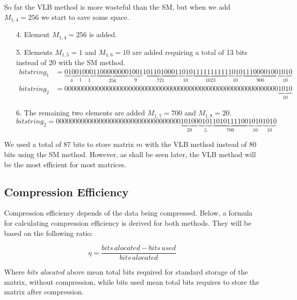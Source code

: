 \documentclass[10pt]{article}
\begin{document}
So far the VLB method is more wasteful than the SM, but when we add $M_{1,4} =256$  we start to save some space.

\begin{enumerate}
 \item[4.] Element $M_{1,4} =256$ is added.  
 \item [5.] Elements $M_{1,5} =1$ and $M_{1,6} =10$ are added requiring a total of 13 bits instead of 20 with the SM method.
 \begin{align*} \label{eq:16}
 bitstring_1 &=
 \underbrace{0100}_{4}\underbrace{1}_{1}\underbrace{0001}_{1}\underbrace{100000000}_{256}\underbrace{1001}_{9}\underbrace{1011010001}_{721}\underbrace{1010}_{10}\underbrace{1111111111}_{1023}\underbrace{1010}_{10}\underbrace{1110000100}_{900}\underbrace{1010}_{10} \\
 bitstring_2 &= 000000000000000000000000000000000000000000000000000000000000\underbrace{1010}_{10}
\end{align*}
 \item [6.] The remaining two elements are added $M_{1,7} =700$ and $M_{1,8} =20$.
 \begin{equation*} \label{eq:18}
 bitstring_2 = 00000000000000000000000000000000000\underbrace{10100}_{20}\underbrace{0101}_{5}\underbrace{1010111100}_{700}\underbrace{1010}_{10}\underbrace{1010}_{10}
\end{equation*}
\end{enumerate}





 We used a total of 87 bits to store matrix $m$ with the VLB method instead of 80 bits using the SM method. However, as shall be seen later, the VLB method will be the most efficient for most matrices.
 
 \subsection*{Compression Efficiency}
 Compression efficiency depends of the data being compressed. Below, a formula for calculating compression efficiency is derived for both methods. They will be based on the following ratio:
 
 \begin{equation}\label{eq:eff1}
  \eta=\frac{bits\, alocated-bits\, used}{bits\,alocated}
 \end{equation}
 
 Where \textit{bits alocated} above mean total bits required for standard storage of the matrix, without compression, while bits used mean total bits requires to store the matrix after compression.
\end{document}
